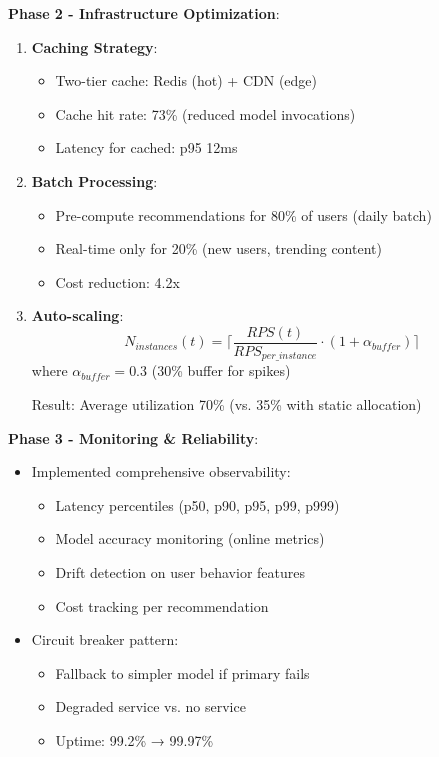 \textbf{Phase 2 - Infrastructure Optimization}:
\begin{enumerate}
    \item \textbf{Caching Strategy}:
        \begin{itemize}
            \item Two-tier cache: Redis (hot) + CDN (edge)
            \item Cache hit rate: 73\% (reduced model invocations)
            \item Latency for cached: p95 12ms
        \end{itemize}

    \item \textbf{Batch Processing}:
        \begin{itemize}
            \item Pre-compute recommendations for 80\% of users (daily batch)
            \item Real-time only for 20\% (new users, trending content)
            \item Cost reduction: 4.2x
        \end{itemize}

    \item \textbf{Auto-scaling}:
        \begin{equation}
        N_{instances}(t) = \lceil \frac{RPS(t)}{RPS_{per\_instance}} \cdot (1 + \alpha_{buffer}) \rceil
        \end{equation}
        where $\alpha_{buffer} = 0.3$ (30\% buffer for spikes)

        Result: Average utilization 70\% (vs. 35\% with static allocation)
\end{enumerate}

\textbf{Phase 3 - Monitoring \& Reliability}:
\begin{itemize}
    \item Implemented comprehensive observability:
        \begin{itemize}
            \item Latency percentiles (p50, p90, p95, p99, p999)
            \item Model accuracy monitoring (online metrics)
            \item Drift detection on user behavior features
            \item Cost tracking per recommendation
        \end{itemize}

    \item Circuit breaker pattern:
        \begin{itemize}
            \item Fallback to simpler model if primary fails
            \item Degraded service vs. no service
            \item Uptime: 99.2\% → 99.97\%
        \end{itemize}
\end{itemize}

